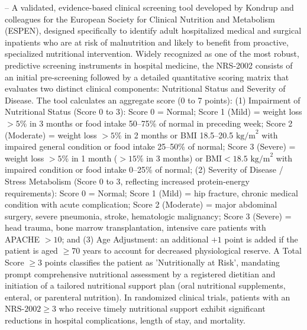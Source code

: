 -- A validated, evidence-based clinical screening tool developed by Kondrup and colleagues for the European Society for Clinical Nutrition and Metabolism (ESPEN), designed specifically to identify adult hospitalized medical and surgical inpatients who are at risk of malnutrition and likely to benefit from proactive, specialized nutritional intervention. Widely recognized as one of the most robust, predictive screening instruments in hospital medicine, the NRS-2002 consists of an initial pre-screening followed by a detailed quantitative scoring matrix that evaluates two distinct clinical components: Nutritional Status and Severity of Disease. The tool calculates an aggregate score (0 to 7 points): (1) Impairment of Nutritional Status (Score 0 to 3): Score 0 = Normal; Score 1 (Mild) = weight loss $>5\%$ in 3 months or food intake 50--75\% of normal in preceding week; Score 2 (Moderate) = weight loss $>5\%$ in 2 months or BMI 18.5--20.5 $\text{kg/m}^2$ with impaired general condition or food intake 25--50\% of normal; Score 3 (Severe) = weight loss $>5\%$ in 1 month ($>15\%$ in 3 months) or $\text{BMI} < 18.5\text{ kg/m}^2$ with impaired condition or food intake 0--25\% of normal; (2) Severity of Disease / Stress Metabolism (Score 0 to 3, reflecting increased protein-energy requirements): Score 0 = Normal; Score 1 (Mild) = hip fracture, chronic medical condition with acute complication; Score 2 (Moderate) = major abdominal surgery, severe pneumonia, stroke, hematologic malignancy; Score 3 (Severe) = head trauma, bone marrow transplantation, intensive care patients with APACHE $>10$; and (3) Age Adjustment: an additional $+1$ point is added if the patient is aged $\ge 70$ years to account for decreased physiological reserve. A Total Score $\ge 3$ points classifies the patient as 'Nutritionally at Risk', mandating prompt comprehensive nutritional assessment by a registered dietitian and initiation of a tailored nutritional support plan (oral nutritional supplements, enteral, or parenteral nutrition). In randomized clinical trials, patients with an $\text{NRS-2002} \ge 3$ who receive timely nutritional support exhibit significant reductions in hospital complications, length of stay, and mortality.

